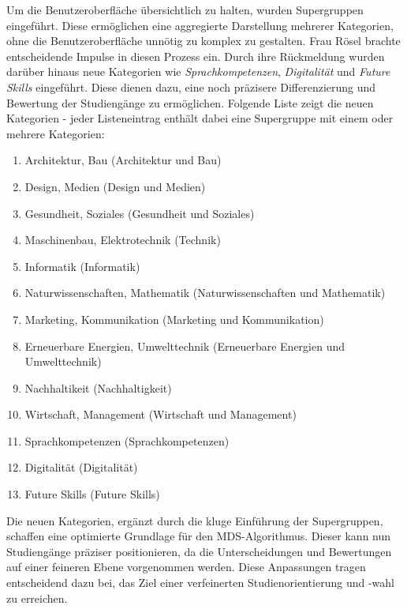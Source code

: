 Um die Benutzeroberfläche übersichtlich zu halten, wurden Supergruppen
eingeführt. Diese ermöglichen eine aggregierte Darstellung mehrerer Kategorien,
ohne die Benutzeroberfläche unnötig zu komplex zu gestalten. Frau Rösel brachte
entscheidende Impulse in diesen Prozess ein. Durch ihre Rückmeldung wurden
darüber hinaus neue Kategorien wie \textit{Sprachkompetenzen},
\textit{Digitalität} und \textit{Future Skills} eingeführt. Diese dienen dazu,
eine noch präzisere Differenzierung und Bewertung der Studiengänge zu
ermöglichen. Folgende Liste zeigt die neuen Kategorien - jeder Listeneintrag
enthält dabei eine Supergruppe mit einem oder mehrere Kategorien:

\begin{enumerate}
    \item Architektur, Bau (Architektur und Bau)
    \item Design, Medien (Design und Medien)
    \item Gesundheit, Soziales (Gesundheit und Soziales)
    \item Maschinenbau, Elektrotechnik (Technik)
    \item Informatik (Informatik)
    \item Naturwissenschaften, Mathematik (Naturwissenschaften und Mathematik)
    \item Marketing, Kommunikation (Marketing und Kommunikation)
    \item Erneuerbare Energien, Umwelttechnik (Erneuerbare Energien und
    Umwelttechnik)
    \item Nachhaltikeit (Nachhaltigkeit)
    \item Wirtschaft, Management (Wirtschaft und Management)
    \item Sprachkompetenzen (Sprachkompetenzen)
    \item Digitalität (Digitalität)
    \item Future Skills (Future Skills)
\end{enumerate}

Die neuen Kategorien, ergänzt durch die kluge Einführung der Supergruppen,
schaffen eine optimierte Grundlage für den MDS-Algorithmus. Dieser kann nun
Studiengänge präziser positionieren, da die Unterscheidungen und Bewertungen auf
einer feineren Ebene vorgenommen werden. Diese Anpassungen tragen entscheidend
dazu bei, das Ziel einer verfeinerten Studienorientierung und -wahl zu
erreichen.